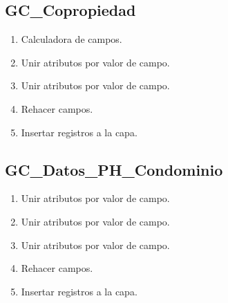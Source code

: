 \documentclass[letterpaper,10pt,spanish]{sphinxmanual}
\begin{document}
\subsection{GC\_Copropiedad}
\label{\detokenize{ETL_Cobol/Model:gc-copropiedad}}\begin{enumerate}
%
\item {} 
Calculadora de campos.

\item {} 
Unir atributos por valor de campo.

\item {} 
Unir atributos por valor de campo.

\item {} 
Rehacer campos.

\item {} 
Insertar registros a la capa.


\end{enumerate}


\subsection{GC\_Datos\_PH\_Condominio}
\label{\detokenize{ETL_Cobol/Model:gc-datos-ph-condominio}}\begin{enumerate}
%
\item {} 
Unir atributos por valor de campo.

\item {} 
Unir atributos por valor de campo.

\item {} 
Unir atributos por valor de campo.

\item {} 
Rehacer campos.

\item {} 
Insertar registros a la capa.


\end{enumerate}
\end{document}
